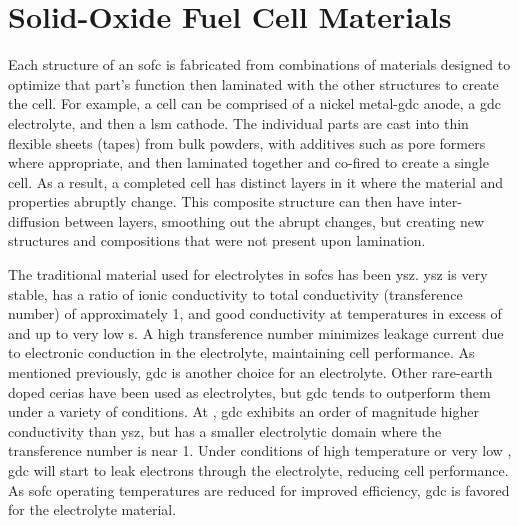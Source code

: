 \section{Solid-Oxide Fuel Cell Materials}
    Each structure of an \gls{sofc} is fabricated from combinations of materials designed to optimize that part's function then laminated with the other structures to create the cell.
    For example, a cell can be comprised of a nickel metal-\gls{gdc} anode, a \gls{gdc} electrolyte, and then a \gls{lsm} cathode.\cite{Liu2002,Haile2003}
    The individual parts are cast into thin flexible sheets (tapes) from bulk powders, with additives such as pore formers where appropriate, and then laminated together and co-fired to create a single cell.
    As a result, a completed cell has distinct layers in it where the material and properties abruptly change.
    This composite structure can then have inter-diffusion between layers, smoothing out the abrupt changes, but creating new structures and compositions that were not present upon lamination.\cite{Yokokawa2008}

    The traditional material used for electrolytes in \glspl{sofc} has been \gls{ysz}.
    \Gls{ysz} is very stable, has a ratio of ionic conductivity to total conductivity (transference number) of approximately 1, and good conductivity at temperatures in excess of  and up to very low s.
    A high transference number minimizes leakage current due to electronic conduction in the electrolyte, maintaining cell performance.
    As mentioned previously, \gls{gdc} is another choice for an electrolyte.
    Other rare-earth doped cerias have been used as electrolytes, but \gls{gdc} tends to outperform them under a variety of conditions.
    At , \gls{gdc} exhibits an order of magnitude higher conductivity than \gls{ysz}, but has a smaller electrolytic domain where the transference number is near 1.\cite{Inaba1996}
    Under conditions of high temperature or very low , \gls{gdc} will start to leak electrons through the electrolyte, reducing cell performance.
    As \gls{sofc} operating temperatures are reduced for improved efficiency, \gls{gdc} is favored for the electrolyte material.

